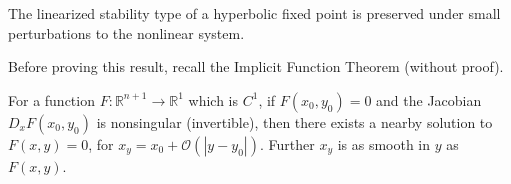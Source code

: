 \begin{proposition}[]
	The linearized stability type of a hyperbolic fixed point is preserved under small perturbations to the nonlinear system.
\end{proposition}
Before proving this result, recall the Implicit Function Theorem (without proof).

\begin{theorem}
	For a function $F:\mathbb{R}^{n+1} \to \mathbb{R}^{1}$ which is $C^1$, if  $F( {x_0} , y_0 ) = 0$ and the Jacobian $D_{{x} }F({x_0} , y_0 )$ is nonsingular (invertible), then there exists a nearby solution to $F({x} , y )=0 $, for ${x_y} = {x_0}  + \mathcal{O}(|y-y_0|)$. Further ${x_y} $ is as smooth in $y$ as $F({x} ,y)$.
\end{theorem}

